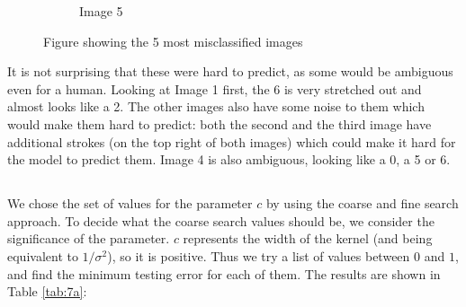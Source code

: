 \documentclass[final,3p,times,12pt]{article}
\begin{document}
\begin{figure}[H]
{\begin{minipage}{\linewidth}
\begin{subfigure}[b]{0.3\linewidth}
                \caption{Image 5}
                \label{fig:image5}
            \end{subfigure}
        \end{minipage}
    }
    \caption{Figure showing the 5 most misclassified images}
    \label{fig:all-images}
\end{figure}

It is not surprising that these were hard to predict, as some would be ambiguous even for a human. Looking at Image 1 first, the 6 is very stretched out and almost looks like a 2. The other images also have some noise to them which would make them hard to predict: both the second and the third image have additional strokes (on the top right of both images) which could make it hard for the model to predict them. Image 4 is also ambiguous, looking like a 0, a 5 or 6. 

\subsection{}
\subsubsection{}

We chose the set of values for the parameter $c$ by using the coarse and fine search approach. To decide what the coarse search values should be, we consider the significance of the parameter. $c$ represents the width of the kernel (and being equivalent to $1/\sigma^2$), so it is positive. Thus we try a list of values between $0$ and $1$, and find the minimum testing error for each of them. The results are shown in Table \ref{tab:7a}:
\end{document}
